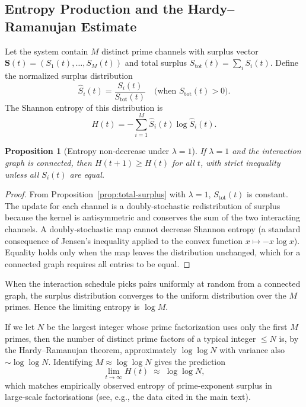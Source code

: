 \documentclass[11pt]{article}
\newtheorem{proposition}{Proposition}
\begin{document}
\subsection{Entropy Production and the Hardy–Ramanujan Estimate}
Let the system contain $M$ distinct prime channels with surplus vector $\mathbf{S}(t)=(S_1(t),\dots,S_M(t))$ and total surplus $S_{\mathrm{tot}}(t)=\sum_i S_i(t)$. Define the normalized surplus distribution
\[
    \hat S_i(t)=\frac{S_i(t)}{S_{\mathrm{tot}}(t)}\quad\text{(when }S_{\mathrm{tot}}(t)>0\text{)}.
\]
The Shannon entropy of this distribution is
\[
    H(t)=-\sum_{i=1}^M\hat S_i(t)\log\hat S_i(t).
\]
\begin{proposition}[Entropy non‑decrease under $\lambda=1$]\label{prop:entropy-inc}
If $\lambda=1$ and the interaction graph is connected, then $H(t+1)\ge H(t)$ for all $t$, with strict inequality unless all $S_i(t)$ are equal.
\end{proposition}
\begin{proof}
From Proposition~\ref{prop:total-surplus} with $\lambda=1$, $S_{\mathrm{tot}}(t)$ is constant. The update for each channel is a doubly‑stochastic redistribution of surplus because the kernel is antisymmetric and conserves the sum of the two interacting channels. A doubly‑stochastic map cannot decrease Shannon entropy (a standard consequence of Jensen’s inequality applied to the convex function $x\mapsto -x\log x$). Equality holds only when the map leaves the distribution unchanged, which for a connected graph requires all entries to be equal.
\end{proof}
When the interaction schedule picks pairs uniformly at random from a connected graph, the surplus distribution converges to the uniform distribution over the $M$ primes. Hence the limiting entropy is $\log M$.  

If we let $N$ be the largest integer whose prime factorization uses only the first $M$ primes, then the number of distinct prime factors of a typical integer $\le N$ is, by the Hardy–Ramanujan theorem, approximately $\log\log N$ with variance also $\sim\log\log N$. Identifying $M\approx\log\log N$ gives the prediction
\[
    \lim_{t\to\infty} H(t) \;\approx\; \log\log N,
\]
which matches empirically observed entropy of prime‑exponent surplus in large‑scale factorisations (see, e.g., the data cited in the main text).
\end{document}

